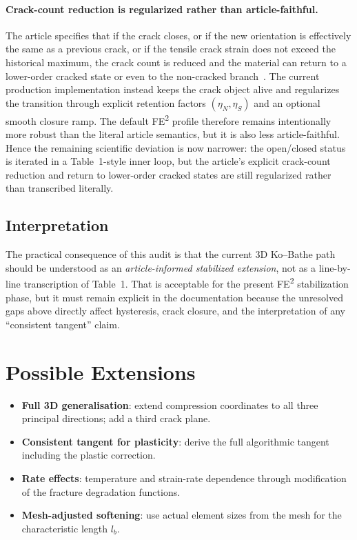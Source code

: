\paragraph{Crack-count reduction is regularized rather than article-faithful.}
The article specifies that if the crack closes, or if the new orientation is
effectively the same as a previous crack, or if the tensile crack strain does
not exceed the historical maximum, the crack count is reduced and the material
can return to a lower-order cracked state or even to the non-cracked
branch~\cite{KoBathe2026}.  The current production implementation instead keeps
the crack object alive and regularizes the transition through explicit
retention factors \((\eta_N,\eta_S)\) and an optional smooth closure ramp.  The
default FE\textsuperscript{2} profile therefore remains intentionally more
robust than the literal article semantics, but it is also less
article-faithful.  Hence the remaining scientific deviation is now narrower:
the open/closed status is iterated in a Table~1-style inner loop, but the
article's explicit crack-count reduction and return to lower-order cracked
states are still regularized rather than transcribed literally.

\subsection{Interpretation}

The practical consequence of this audit is that the current 3D Ko--Bathe path
should be understood as an \emph{article-informed stabilized extension}, not as
a line-by-line transcription of Table~1.  That is acceptable for the present
FE\textsuperscript{2} stabilization phase, but it must remain explicit in the
documentation because the unresolved gaps above directly affect hysteresis,
crack closure, and the interpretation of any ``consistent tangent'' claim.

\section{Possible Extensions}
\label{sec:kb-extensions}

\begin{itemize}
  \item \textbf{Full 3D generalisation}: extend compression coordinates
        to all three principal directions; add a third crack plane.
  \item \textbf{Consistent tangent for plasticity}: derive the full
        algorithmic tangent including the plastic correction.
  \item \textbf{Rate effects}: temperature and strain-rate dependence through
        modification of the fracture degradation functions.
  \item \textbf{Mesh-adjusted softening}: use actual element sizes from
        the mesh for the characteristic length $l_b$.
\end{itemize}
